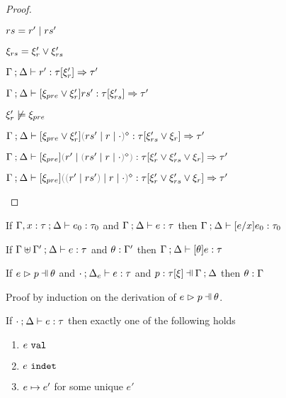 \begin{proof}
\begin{byCases}
  \item[\text{(\ref{rule:CTRules})}]
    \begin{pfsteps*}
    \item $rs = r' \mid rs'$ 
    \item $\xi_{rs} = \xi_r' \vee \xi_{rs}'$ 
    \item $\Gamma \mathbin{;} \Delta \vdash r' : \tau [\xi_r'] \Rightarrow \tau'$  
    \item $\Gamma \mathbin{;} \Delta \vdash [\xi_{pre} \vee \xi_r'] rs' : \tau [\xi_{rs}'] \Rightarrow \tau'$  
    \item $\xi_r' \not\models \xi_{pre}$  
    \item $\chrulstyp{\Gamma}{\Delta}{\cor{\xi_{pre}}{\xi_r'}}{\rmpointer{\zruls{rs'}{r}{\cdot}}}{\tau}{\cor{\xi_{rs}'}{\xi_r}}{\tau'}$  
    \item $\chrulstyp{\Gamma}{\Delta}{\xi_{pre}}{\hrulesP{r'}{\rmpointer{\zruls{rs'}{r}{\cdot}}}}{\tau}{\cor{\xi_r'}{\cor{\xi_{rs}'}{\xi_r}}}{\tau'}$  
    \item $\chrulstyp{\Gamma}{\Delta}{\xi_{pre}}{\rmpointer{\zruls{\hrulesP{r'}{rs'}}{r}{\cdot}}}{\tau}{\cor{\xi_r'}{\cor{\xi_{rs}'}{\xi_r}}}{\tau'}$ 
    \end{pfsteps*}
  \resetpfcounter
  \end{byCases}
\end{proof}

\begin{lemma}[Substitution]
  \label{lem:substitution}
  If $\Gamma, x : \tau \mathbin{;} \Delta \vdash e_0 : \tau_0$ and $\Gamma \mathbin{;} \Delta \vdash e : \tau$
  then $\Gamma \mathbin{;} \Delta \vdash [e/x]e_0 : \tau_0$
\end{lemma}

\begin{lemma}
  \label{lem:simult-substitution}
  If $\Gamma \uplus \Gamma' \mathbin{;} \Delta \vdash e : \tau$ and $\theta : \Gamma'$
  then $\Gamma \mathbin{;} \Delta \vdash [\theta]e : \tau$
\end{lemma}

\begin{lemma}
  \label{lem:subs-typing}
  If $\hpatmatch{e}{p}{\theta}$ and $\cdot \mathbin{;} \Delta_e \vdash e : \tau$ and $\chpattyp{p}{\tau}{\xi}{\Gamma}{\Delta}$
  then $\theta : \Gamma$
\end{lemma}
Proof by induction on the derivation of $\hpatmatch{e}{p}{\theta}$.

\begin{theorem}[Determinism]
  \label{thrm:determinism}
  If $\cdot \mathbin{;} \Delta \vdash e : \tau$ then exactly one of the following holds
  \begin{enumerate}
    \item $e ~\mathtt{val}$
    \item $e ~\mathtt{indet}$
    \item $e \mapsto e'$ for some unique $e'$
  \end{enumerate}
\end{theorem}
